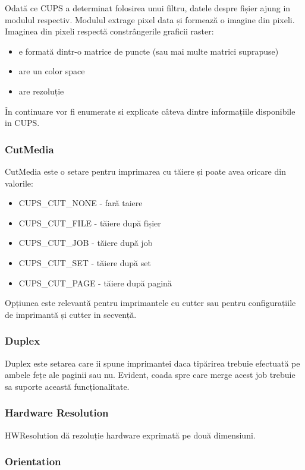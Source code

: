 \documentclass[a4paper, 12pt, twoside]{report}
\begin{document}
\bigskip

Odată ce CUPS a determinat folosirea unui filtru, datele despre fișier ajung in modulul respectiv. Modulul extrage pixel data și formează o imagine din pixeli. Imaginea din pixeli respectă constrângerile graficii raster:
\begin{itemize}
\item e formată dintr-o matrice de puncte (sau mai multe matrici suprapuse)
\item are un color space
\item are rezoluție
\end{itemize}

În continuare vor fi enumerate si explicate câteva dintre informațiile disponibile in CUPS.
			
			\subsubsection{CutMedia}
CutMedia este o setare pentru imprimarea cu tăiere și poate avea oricare din valorile:
\begin{itemize}
\item CUPS\_CUT\_NONE - fară taiere
\item CUPS\_CUT\_FILE - tăiere după fișier
\item CUPS\_CUT\_JOB - tăiere după job
\item CUPS\_CUT\_SET - tăiere după set
\item CUPS\_CUT\_PAGE - tăiere după pagină
\end{itemize}
Opțiunea este relevantă pentru imprimantele cu cutter sau pentru configurațiile de imprimantă și cutter in secvență.

			\subsubsection{Duplex}
Duplex este setarea care ii spune imprimantei daca tipărirea trebuie efectuată pe ambele fețe ale paginii sau nu. Evident, coada spre care merge acest job trebuie sa suporte această funcționalitate. 

			\subsubsection{Hardware Resolution}
HWResolution dă rezoluție hardware exprimată pe două dimensiuni.

			\subsubsection{Orientation}
\end{document}
